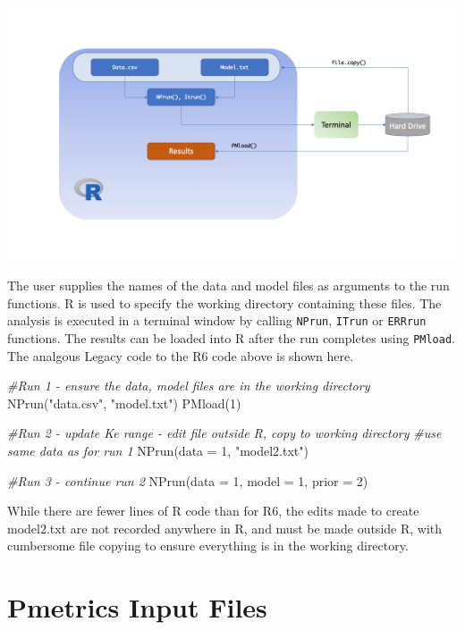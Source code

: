 \documentclass[
]{book}
\newenvironment{Shaded}{\begin{snugshade}}{\end{snugshade}}
\newcommand{\AttributeTok}[1]{\textcolor[rgb]{0.77,0.63,0.00}{#1}}
\newcommand{\CommentTok}[1]{\textcolor[rgb]{0.56,0.35,0.01}{\textit{#1}}}
\newcommand{\DecValTok}[1]{\textcolor[rgb]{0.00,0.00,0.81}{#1}}
\newcommand{\FunctionTok}[1]{\textcolor[rgb]{0.00,0.00,0.00}{#1}}
\newcommand{\NormalTok}[1]{#1}
\newcommand{\StringTok}[1]{\textcolor[rgb]{0.31,0.60,0.02}{#1}}
\begin{document}
\includegraphics{Images/Slide2.png}

The user supplies the names of the data and model files as arguments to
the run functions. R is used to specify the working directory containing these files. The analysis is executed in a terminal window by calling \texttt{NPrun}, \texttt{ITrun} or \texttt{ERRrun} functions. The results can be loaded into R after the run completes using
\texttt{PMload}. The analgous Legacy code to the R6 code above is shown here.

\begin{Shaded}
\begin{Highlighting}[]
\CommentTok{\#Run 1 {-} ensure the data, model files are in the working directory}
\FunctionTok{NPrun}\NormalTok{(}\StringTok{"data.csv"}\NormalTok{, }\StringTok{"model.txt"}\NormalTok{)}
\FunctionTok{PMload}\NormalTok{(}\DecValTok{1}\NormalTok{) }

\CommentTok{\#Run 2 {-} update Ke range {-} edit file outside R, copy to working directory}
\CommentTok{\#use same data as for run 1}
\FunctionTok{NPrun}\NormalTok{(}\AttributeTok{data =} \DecValTok{1}\NormalTok{, }\StringTok{"model2.txt"}\NormalTok{)}

\CommentTok{\#Run 3 {-} continue run 2}
\FunctionTok{NPrun}\NormalTok{(}\AttributeTok{data =} \DecValTok{1}\NormalTok{, }\AttributeTok{model =} \DecValTok{1}\NormalTok{, }\AttributeTok{prior =} \DecValTok{2}\NormalTok{)}
\end{Highlighting}
\end{Shaded}

While there are fewer lines of R code than for R6, the edits made to create model2.txt are not recorded anywhere in R, and must be made outside R, with cumbersome file copying to ensure everything is in the working directory.

\hypertarget{pmetrics-input-files}{%
\chapter{Pmetrics Input Files}\label{pmetrics-input-files}}
\end{document}
